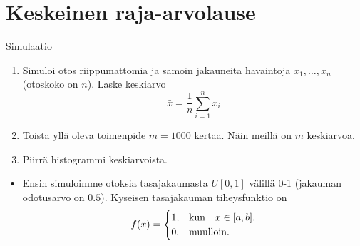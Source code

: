 \documentclass{beamer}
\begin{document}
\section{Keskeinen raja-arvolause}


\begin{frame}{Simulaatio}
  \begin{enumerate}
    \item Simuloi otos riippumattomia ja samoin jakauneita havaintoja $x_1,
    \ldots, x_n$ (otoskoko on $n$). Laske keskiarvo
    \begin{equation*}
      \bar x = \frac{1}{n}\sum_{i=1}^n x_i
    \end{equation*}
    \pause
    \item Toista yllä oleva toimenpide $m = 1000$ kertaa. Näin meillä on $m$
    keskiarvoa.
    \pause
    \item Piirrä histogrammi keskiarvoista.
  \end{enumerate}
\end{frame}


\begin{frame}
  \begin{itemize}
    \item Ensin simuloimme otoksia tasajakaumasta $U[0,1]$ välillä 0-1 (jakauman
    odotusarvo on $0.5$). Kyseisen tasajakauman tiheysfunktio on
    \begin{equation*}
      f(x) =
      \begin{cases}
        1, &\textnormal{kun}\quad x\in[a,b], \\
        0, &\textnormal{muulloin}. 
      \end{cases}
    \end{equation*}
  \end{itemize}
\end{frame}

\end{document}
